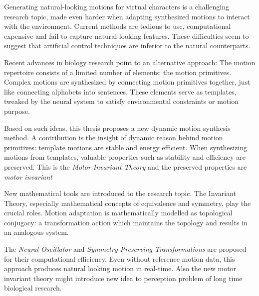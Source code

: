 


\begin{abstracts}        %

Generating natural-looking motions for virtual characters is a challenging research topic, made even harder when adapting synthesized motions to interact with the environment. 
Current methods are tedious to use, computational expensive and fail to capture natural looking features.
These difficulties seem to suggest that artificial control techniques are inferior to the natural counterparts.

Recent advances in biology research point to an alternative approach:
The motion repertoire consists of a limited number of elements: the motion primitives. 
Complex motions are synthesized by connecting motion primitives together, just like connecting alphabets into sentences.
These elements serve as templates, tweaked by the neural system to satisfy  environmental constraints or motion purpose.


Based on such ideas,   this thesis proposes a new dynamic motion synthesis method.
A contribution is the insight of dynamic reason behind motion primitives: template motions are stable and energy efficient. 
When synthesizing motions from templates, valuable properties such as stability and efficiency are preserved.
This is the \emph{Motor Invariant Theory} and the preserved properties are \emph{motor invariant}

New mathematical tools are introduced to the research topic.
The Invariant Theory, especially mathematical concepts of equivalence and symmetry, play the crucial roles.
Motion adaptation is mathematically modelled as topological conjugacy: a transformation action which maintains the topology and results in an analogous system.

The \emph{Neural Oscillator} and \emph{Symmetry Preserving Transformations} are proposed for their computational efficiency.
Even without reference motion data, this approach produces natural looking motion in real-time.
Also the new motor invariant theory might  introduce new idea to perception problem of long time biological research.

\end{abstracts}





